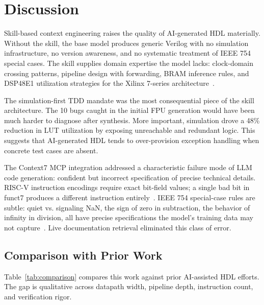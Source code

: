 \documentclass[journal]{IEEEtran}
\begin{document}
\section{Discussion}

Skill-based context engineering raises the quality of AI-generated HDL materially. Without the skill, the base model produces generic Verilog with no simulation infrastructure, no version awareness, and no systematic treatment of IEEE 754 special cases. The skill supplies domain expertise the model lacks: clock-domain crossing patterns, pipeline design with forwarding, BRAM inference rules, and DSP48E1 utilization strategies for the Xilinx 7-series architecture~\cite{xilinx2020ds180}.

The simulation-first TDD mandate was the most consequential piece of the skill architecture. The 10 bugs caught in the initial FPU generation would have been much harder to diagnose after synthesis. More important, simulation drove a 48\% reduction in LUT utilization by exposing unreachable and redundant logic. This suggests that AI-generated HDL tends to over-provision exception handling when concrete test cases are absent.

The Context7 MCP integration addressed a characteristic failure mode of LLM code generation: confident but incorrect specification of precise technical details. RISC-V instruction encodings require exact bit-field values; a single bad bit in funct7 produces a different instruction entirely~\cite{waterman2019riscv}. IEEE 754 special-case rules are subtle: quiet vs. signaling NaN, the sign of zero in subtraction, the behavior of infinity in division, all have precise specifications the model's training data may not capture~\cite{ieee754_2019}. Live documentation retrieval eliminated this class of error.

\subsection{Comparison with Prior Work}

Table~\ref{tab:comparison} compares this work against prior AI-assisted HDL efforts. The gap is qualitative across datapath width, pipeline depth, instruction count, and verification rigor.
\end{document}

